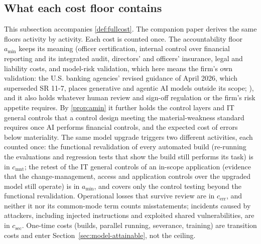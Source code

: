 \subsection{What each cost floor contains}\label{supp:model-floors}
This subsection accompanies \autoref{def:fullcost}. The companion paper \citep{murthy2026transformation} derives the same floors activity by activity. Each cost is counted once. The accountability floor $a_{\min}$ keeps its meaning (officer certification, internal control over financial reporting and its integrated audit, directors' and officers' insurance, legal and liability costs, and model-risk validation, which here means the firm's own validation: the U.S. banking agencies' revised guidance of April 2026, which superseded SR 11-7, places generative and agentic AI models outside its scope; \citealp{fed2026sr262,occ2026bulletin13}), and it also holds whatever human review and sign-off regulation or the firm's risk appetite requires. By \autoref{prop:amin} it further holds the control layers and IT general controls that a control design meeting the material-weakness standard requires once AI performs financial controls, and the expected cost of errors below materiality. The same model upgrade triggers two different activities, each counted once: the functional revalidation of every automated build (re-running the evaluations and regression tests that show the build still performs its task) is in $c_{\mathrm{mnt}}$; the retest of the IT general controls of an in-scope application (evidence that the change-management, access and application controls over the upgraded model still operate) is in $a_{\min}$, and covers only the control testing beyond the functional revalidation. Operational losses that survive review are in $c_{\mathrm{err}}$, and neither it nor its common-mode term counts misstatements; incidents caused by attackers, including injected instructions and exploited shared vulnerabilities, are in $c_{\mathrm{sec}}$. One-time costs (builds, parallel running, severance, training) are transition costs and enter Section~\ref{sec:model-attainable}, not the ceiling.

